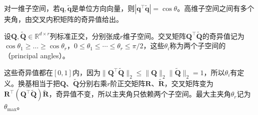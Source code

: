 对一维子空间，若$\bm q,\widetilde{\bm q}$是单位方向向量，则$|\bm q^\top\widetilde{\bm q}|=\cos\theta$。高维子空间之间有多个夹角，由交叉内积矩阵的奇异值给出。
\begin{definition}[主夹角]
\label{def:matrix-analysis-principal-angles}
设$\bm Q,\widetilde{\bm Q}\in\mathbb R^{d\times r}$列标准正交，分别张成$r$维子空间。交叉矩阵$\bm Q^\top\widetilde{\bm Q}$的奇异值记为$\cos\theta_1\geq\dots\geq\cos\theta_r$，$0\leq\theta_1\leq\cdots\leq\theta_r\leq\pi/2$，这些$\theta_i$称为两个子空间的（principal angles）。
\end{definition}
这些奇异值都在$[0,1]$内，因为$\lVert\bm Q^\top\widetilde{\bm Q}\rVert_2\leq\lVert\bm Q\rVert_2\lVert\widetilde{\bm Q}\rVert_2=1$，所以$\theta_i$有定义。换基相当于把$\bm Q$、$\widetilde{\bm Q}$分别右乘$r$阶正交矩阵$\bm R$、$\widetilde{\bm R}$，交叉矩阵变为$\bm R^\top(\bm Q^\top\widetilde{\bm Q})\widetilde{\bm R}$，奇异值不变，所以主夹角只依赖两个子空间。最大主夹角$\theta_r$记为$\theta_{\max}$。

